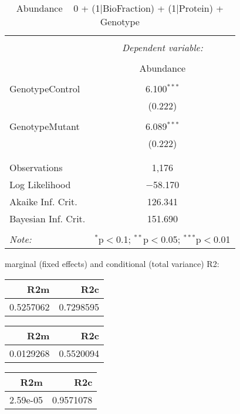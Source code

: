 \documentclass[11pt]{report}
\begin{document}
\begin{table}[!htbp] \centering 
  \caption{Abundance ~ 0 + (1|BioFraction) + (1|Protein) + Genotype} 
  \label{} 
\begin{tabular}{@{\extracolsep{5pt}}lc} 
\\[-1.8ex]\hline 
\hline \\[-1.8ex] 
 & \multicolumn{1}{c}{\textit{Dependent variable:}} \\ 
\cline{2-2} 
\\[-1.8ex] & Abundance \\ 
\hline \\[-1.8ex] 
 GenotypeControl & 6.100$^{***}$ \\ 
  & (0.222) \\ 
  & \\ 
 GenotypeMutant & 6.089$^{***}$ \\ 
  & (0.222) \\ 
  & \\ 
\hline \\[-1.8ex] 
Observations & 1,176 \\ 
Log Likelihood & $-$58.170 \\ 
Akaike Inf. Crit. & 126.341 \\ 
Bayesian Inf. Crit. & 151.690 \\ 
\hline 
\hline \\[-1.8ex] 
\textit{Note:}  & \multicolumn{1}{r}{$^{*}$p$<$0.1; $^{**}$p$<$0.05; $^{***}$p$<$0.01} \\ 
\end{tabular} 
\end{table} 
marginal (fixed effects) and conditional (total variance) R2:

\begin{tabular}{r|r}
\hline
R2m & R2c\\
\hline
0.5257062 & 0.7298595\\
\hline
\end{tabular}

\begin{tabular}{r|r}
\hline
R2m & R2c\\
\hline
0.0129268 & 0.5520094\\
\hline
\end{tabular}

\begin{tabular}{r|r}
\hline
R2m & R2c\\
\hline
2.59e-05 & 0.9571078\\
\hline
\end{tabular}
\end{document}
